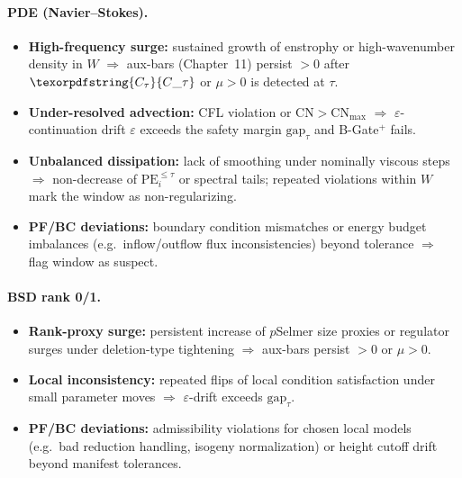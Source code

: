 \documentclass[11pt]{article}
\numberwithin{equation}{section}
\theoremstyle{plain}
\theoremstyle{definition}
\theoremstyle{remark}
\DeclareRobustCommand{\hyp}{\nobreakdash-}
\theoremstyle{plain}
\theoremstyle{definition}
\numberwithin{equation}{section}
\theoremstyle{definition}
\DeclareRobustCommand{\Ctau}{\texorpdfstring{\ensuremath{C_{\tau}}}{C\_\tau}}
\numberwithin{equation}{section}
\theoremstyle{plain}
\theoremstyle{definition}
\theoremstyle{remark}
\providecommand{\Cfun}[1]{\mathsf{C}_{#1}}
\providecommand{\Ctau}{\Cfun{\tau}}
\begin{document}
\paragraph{PDE (Navier–Stokes).}
\begin{itemize}
  \item \textbf{High\hyp frequency surge:} sustained growth of enstrophy or high\hyp wavenumber density in \(W\) \(\Rightarrow\) aux\hyp bars (Chapter~11) persist \(>0\) after \(\Ctau\) or \(\mu>0\) is detected at \(\tau\).
  \item \textbf{Under\hyp resolved advection:} CFL violation or \(\mathrm{CN}>\mathrm{CN}_{\max}\) \(\Rightarrow\) \(\varepsilon\)\hyp continuation drift \(\varepsilon\) exceeds the safety margin \(\mathrm{gap}_\tau\) and B\hyp Gate\(^{+}\) fails.
  \item \textbf{Unbalanced dissipation:} lack of smoothing under nominally viscous steps \(\Rightarrow\) non\hyp decrease of \(\mathrm{PE}_i^{\le\tau}\) or spectral tails; repeated violations within \(W\) mark the window as non\hyp regularizing.
  \item \textbf{PF/BC deviations:} boundary condition mismatches or energy budget imbalances (e.g.\ inflow/outflow flux inconsistencies) beyond tolerance \(\Rightarrow\) flag window as suspect.
\end{itemize}

\paragraph{BSD rank 0/1.}
\begin{itemize}
  \item \textbf{Rank\hyp proxy surge:} persistent increase of \(p\)\nobreakdash Selmer size proxies or regulator surges under deletion\hyp type tightening \(\Rightarrow\) aux\hyp bars persist \(>0\) or \(\mu>0\).
  \item \textbf{Local inconsistency:} repeated flips of local condition satisfaction under small parameter moves \(\Rightarrow\) \(\varepsilon\)\hyp drift exceeds \(\mathrm{gap}_\tau\).
  \item \textbf{PF/BC deviations:} admissibility violations for chosen local models (e.g.\ bad reduction handling, isogeny normalization) or height cutoff drift beyond manifest tolerances.
\end{itemize}
\end{document}
